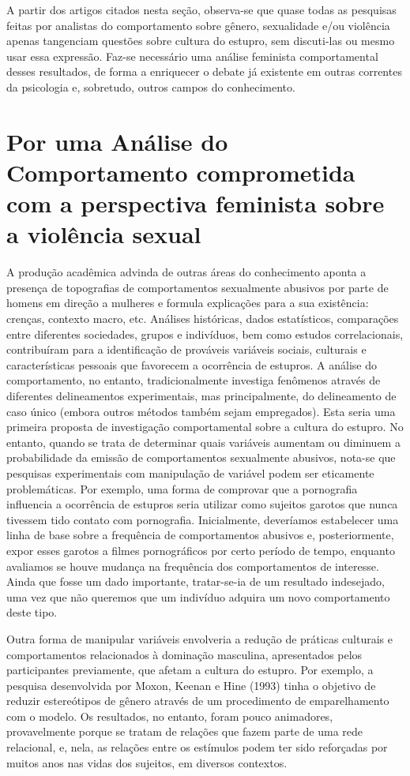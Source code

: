 A partir dos artigos citados nesta seção, observa-se que quase todas as pesquisas feitas por analistas do comportamento sobre gênero, sexualidade e/ou violência apenas tangenciam questões sobre cultura do estupro, sem discuti-las ou mesmo usar essa expressão. Faz-se necessário uma análise feminista comportamental desses resultados, de forma a enriquecer o debate já existente em outras correntes da psicologia e, sobretudo, outros campos do conhecimento.

\section*{Por uma Análise do Comportamento comprometida com a perspectiva feminista sobre a violência sexual}

A produção acadêmica advinda de outras áreas do conhecimento apon\-ta a presença de topografias de comportamentos sexualmente abusivos por parte de homens em direção a mulheres e formula explicações para a sua existência: crenças, contexto macro, etc. Análises históricas, dados estatísticos, comparações entre diferentes sociedades, grupos e indivíduos, bem como estudos correlacionais, contribuíram para a identificação de prováveis variáveis sociais, culturais e características pessoais que favorecem a ocorrência de estupros. A análise do comportamento, no entanto, tradicionalmente investiga fenômenos através de diferentes delineamentos experimentais, mas principalmente, do delineamento de caso único (embora outros métodos também sejam empregados). Esta seria uma primeira proposta de investigação comportamental sobre a cultura do estupro. No entanto, quando se trata de determinar quais variáveis aumentam ou diminuem a probabilidade da emissão de comportamentos sexualmente abusivos, nota-se que pesquisas experimentais com manipulação de variável podem ser eticamente problemáticas. Por exemplo, uma forma de comprovar que a pornografia influencia a ocorrência de estupros seria utilizar como sujeitos garotos que nunca tivessem tido contato com pornografia. Inicialmente, deveríamos estabelecer uma linha de base sobre a frequência de comportamentos abusivos e, posteriormente, expor esses garotos a filmes pornográficos por certo período de tempo, enquanto avaliamos se houve mudança na frequência dos comportamentos de interesse. Ainda que fosse um dado importante, tratar-se-ia de um resultado indesejado, uma vez que não queremos que um indivíduo adquira um novo comportamento deste tipo.

Outra forma de manipular variáveis envolveria a redução de práticas culturais e comportamentos relacionados à dominação masculina, apresentados pelos participantes previamente, que afetam a cultura do estupro. Por exemplo, a pesquisa desenvolvida por Moxon, Keenan e Hine (1993) tinha o objetivo de reduzir estereótipos de gênero através de um procedimento de emparelhamento com o modelo. Os resultados, no entanto, foram pouco animadores, provavelmente porque se tratam de relações que fazem parte de uma rede relacional, e, nela, as relações entre os estímulos podem ter sido reforçadas por muitos anos nas vidas dos sujeitos, em diversos contextos.

